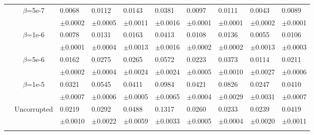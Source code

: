 \documentclass{article}
\begin{document}
\begin{table}[h!]
{\begin{tabularx}{\textwidth}{ccX X X X X X X X}
        & \multirow{2}{*}{$\beta$=5e-7}
        & 0.0068 & 0.0112 & 0.0143 & 0.0381 & 0.0097 & 0.0111 & 0.0043 & 0.0089\\
        &&\scriptsize$\pm$0.0002 & \scriptsize $\pm$0.0005 & \scriptsize $\pm$0.0011 & \scriptsize $\pm$0.0016 & \scriptsize $\pm$0.0001 & \scriptsize $\pm$0.0001 & \scriptsize $\pm$0.0002 & \scriptsize $\pm$0.0001\\
        \cline{3-10}\rule{0pt}{2.3ex}

        & \multirow{2}{*}{$\beta$=1e-6}
        & 0.0078 & 0.0131 & 0.0163 & 0.0413 & 0.0108 & 0.0136 & 0.0055 & 0.0106\\
        &&\scriptsize$\pm$0.0001 & \scriptsize $\pm$0.0004 & \scriptsize $\pm$0.0013 & \scriptsize $\pm$0.0016 & \scriptsize $\pm$0.0002 & \scriptsize $\pm$0.0002 & \scriptsize $\pm$0.0013 & \scriptsize $\pm$0.0003\\
        \cline{3-10}\rule{0pt}{2.3ex}

        & \multirow{2}{*}{$\beta$=5e-6}
        & 0.0162 & 0.0275 & 0.0265 & 0.0572 & 0.0223 & 0.0373 & 0.0114 & 0.0211\\
        &&\scriptsize$\pm$0.0002 & \scriptsize $\pm$0.0004 & \scriptsize $\pm$0.0024 & \scriptsize $\pm$0.0024 & \scriptsize $\pm$0.0005 & \scriptsize $\pm$0.0010 & \scriptsize $\pm$0.0027 & \scriptsize $\pm$0.0006\\
        \cline{3-10}\rule{0pt}{2.3ex}

        & \multirow{2}{*}{$\beta$=1e-5}
        & 0.0321 & 0.0545 & 0.0411 & 0.0984 & 0.0421 & 0.0826 & 0.0247 & 0.0410\\
        &&\scriptsize$\pm$0.0007 & \scriptsize $\pm$0.0006 & \scriptsize $\pm$0.0005 & \scriptsize $\pm$0.0065 & \scriptsize $\pm$0.0004 & \scriptsize $\pm$0.0029 & \scriptsize $\pm$0.0031 & \scriptsize $\pm$0.0007\\

        \hline\rule{0pt}{2.3ex}
        
    
        \multirow{12}{*}{ \textsf{MAE\textsubscript{nf}}}
        \rule{0pt}{2.3ex}
        &\multirow{2}{*}{Uncorrupted}
        &{0.0219} & {0.0292} & {0.0488} & {0.1317} & {0.0260} & {0.0233} & {0.0239} & {0.0419}\\
        &&\scriptsize$\pm$0.0010 & \scriptsize $\pm$0.0022 & \scriptsize $\pm$0.0059 & \scriptsize $\pm$0.0033 & \scriptsize $\pm$0.0005 & \scriptsize $\pm$0.0004 & \scriptsize $\pm$0.0020 & \scriptsize $\pm$0.0011\\
        \cline{3-10}\rule{0pt}{2.3ex}


\end{tabularx}}
\end{table}
\end{document}
